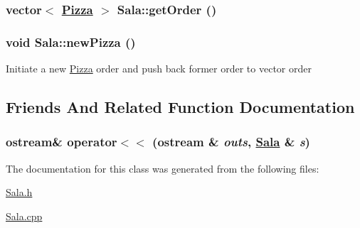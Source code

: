 \hypertarget{class_sala_71e41a58a2a9c2d1927676693909a42c}{
\subsubsection[getOrder]{\setlength{\rightskip}{0pt plus 5cm}vector$<$ \hyperlink{class_pizza}{Pizza} $>$ Sala::get\-Order ()}}
\label{class_sala_71e41a58a2a9c2d1927676693909a42c}


\hypertarget{class_sala_eadce54d849ca6634b7fdd389bd8f192}{
\subsubsection[newPizza]{\setlength{\rightskip}{0pt plus 5cm}void Sala::new\-Pizza ()}}
\label{class_sala_eadce54d849ca6634b7fdd389bd8f192}


Initiate a new \hyperlink{class_pizza}{Pizza} order and push back former order to vector order 

\subsection{Friends And Related Function Documentation}
\hypertarget{class_sala_b32b27b19243c1cf7bcfffe604ea1736}{
\subsubsection[operator$<$$<$]{\setlength{\rightskip}{0pt plus 5cm}ostream\& operator$<$$<$ (ostream \& {\em outs}, \hyperlink{class_sala}{Sala} \& {\em s})}}
\label{class_sala_b32b27b19243c1cf7bcfffe604ea1736}




The documentation for this class was generated from the following files:\begin{CompactItemize}
\item 
\hyperlink{_sala_8h}{Sala.h}\item 
\hyperlink{_sala_8cpp}{Sala.cpp}\end{CompactItemize}
